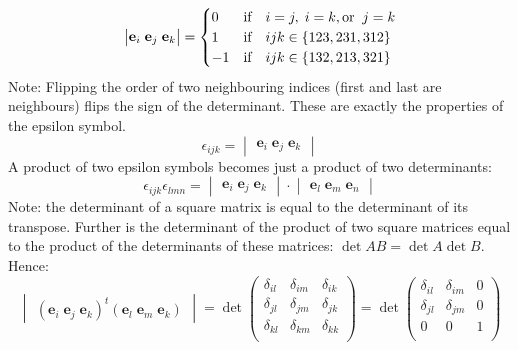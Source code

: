 \documentclass[11pt, oneside]{article}   	%
\begin{document}
\begin{equation}
    \begin{vmatrix} \mathbf{e}_i\;\mathbf{e}_j\;\mathbf{e}_k \end{vmatrix}
    = 
    \begin{cases}
        0 & \hbox{if}\quad i=j,\; i=k,\hbox{or}\; \; j=k \\
        1 & \hbox{if}\quad ijk \in \{123, 231, 312\} \\
        -1 & \hbox{if}\quad  ijk \in \{132, 213, 321\}
    \end{cases}        
\end{equation}
Note: Flipping the order of two neighbouring indices (first and last are neighbours) flips the sign of the 
determinant. These are exactly the properties of the epsilon symbol.
\begin{equation}
    \epsilon_{ijk} = \begin{vmatrix} \mathbf{e}_i\;\mathbf{e}_j\;\mathbf{e}_k \end{vmatrix}
\end{equation}
A product of two epsilon symbols becomes just a product of two determinants:
\begin{equation}
    \epsilon_{ijk}\epsilon_{lmn} = \begin{vmatrix} \mathbf{e}_i\;\mathbf{e}_j\;\mathbf{e}_k \end{vmatrix}
        \cdot \begin{vmatrix} \mathbf{e}_l\;\mathbf{e}_m\;\mathbf{e}_n \end{vmatrix}
\end{equation}
Note: the determinant of a square matrix is equal to the determinant of its transpose. Further is the 
determinant of the product of two square matrices equal to the product of the determinants of these
matrices: $\det AB = \det A \det B$.
Hence:
\begin{equation}
    \begin{vmatrix} (\mathbf{e}_i\;\mathbf{e}_j\;\mathbf{e}_k)^t
    (\mathbf{e}_l\;\mathbf{e}_m\;\mathbf{e}_k) \end{vmatrix}
    = \det 
    \begin{pmatrix}
        \delta_{il} & \delta_{im} & \delta_{ik} \\
        \delta_{jl} & \delta_{jm} & \delta_{jk} \\
        \delta_{kl} & \delta_{km} & \delta_{kk} \\
    \end{pmatrix}
    = \det
    \begin{pmatrix}
        \delta_{il} & \delta_{im} & 0 \\
        \delta_{jl} & \delta_{jm} & 0 \\
        0              & 0           & 1 \\
    \end{pmatrix}
\end{equation}
\end{document}

